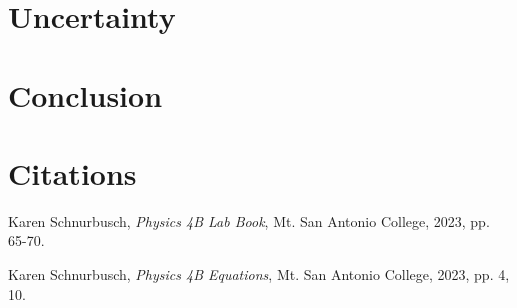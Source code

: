 \documentclass[12pt]{iopart} %
\begin{document}
\section{Uncertainty}

\section{Conclusion}

\section{Citations}

\begin{thebibliography}{9}

  Karen Schnurbusch,
  \textit{Physics 4B Lab Book},
  Mt. San Antonio College,
  2023,
  pp. 65-70.

  Karen Schnurbusch,
  \textit{Physics 4B Equations},
  Mt. San Antonio College,
  2023,
  pp. 4, 10.

\end{thebibliography}
\end{document}
